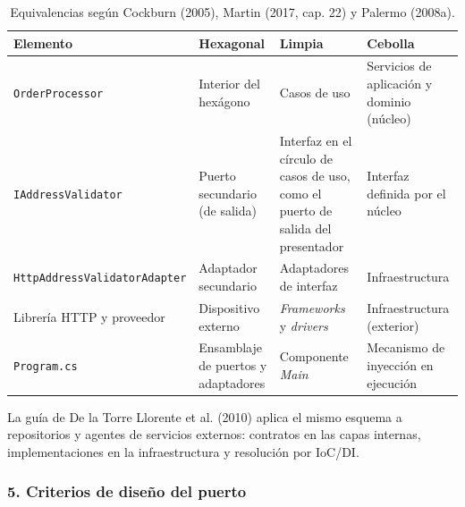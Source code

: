\documentclass[11pt,a4paper]{article}
\begin{document}
\begin{table}[htbp]
\centering
\small
\renewcommand{\arraystretch}{1.25}
\begin{tabularx}{\linewidth}{@{}>{\raggedright\arraybackslash}p{3.3cm}LLL@{}}
\toprule
\textbf{Elemento} & \textbf{Hexagonal} & \textbf{Limpia} & \textbf{Cebolla} \\
\midrule
\texttt{OrderProcessor} & Interior del hexágono & Casos de uso & Servicios de aplicación y dominio (núcleo) \\
\addlinespace
\texttt{IAddressValidator} & Puerto secundario (de salida) & Interfaz en el círculo de casos de uso, como el puerto de salida del presentador & Interfaz definida por el núcleo \\
\addlinespace
\texttt{HttpAddress\allowbreak Validator\allowbreak Adapter} & Adaptador secundario & Adaptadores de interfaz & Infraestructura \\
\addlinespace
Librería HTTP y proveedor & Dispositivo externo & \emph{Frameworks} y \emph{drivers} & Infraestructura (exterior) \\
\addlinespace
\texttt{Program.cs} & Ensamblaje de puertos y adaptadores & Componente \emph{Main} & Mecanismo de inyección en ejecución \\
\bottomrule
\end{tabularx}
\caption{Equivalencias según Cockburn (2005), Martin (2017, cap. 22) y Palermo (2008a).}
\label{tab:equivalencias}
\end{table}

La guía de De la Torre Llorente et al. (2010) aplica el mismo esquema a repositorios y agentes
de servicios externos: contratos en las capas internas, implementaciones en la
infraestructura y resolución por IoC/DI.

\subsubsection*{5. Criterios de diseño del puerto}
\end{document}
